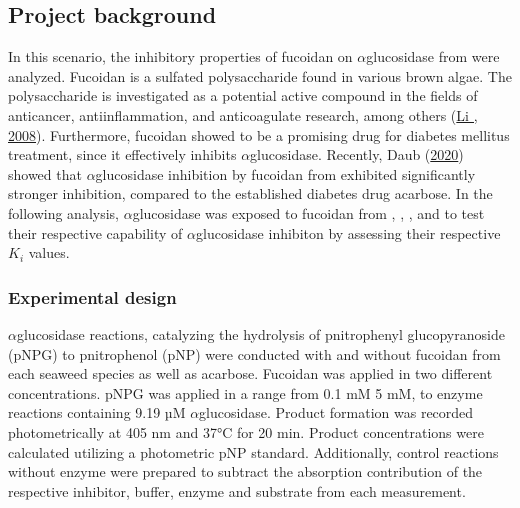 \documentclass[letterpaper,12pt,english]{jupyterBook}
\begin{document}
\subsection{Project background}
\label{\detokenize{scenarios/glycosidase_inhibition:project-background}}
\sphinxAtStartPar
In this scenario, the inhibitory properties of fucoidan on \(\alpha\)\sphinxhyphen{}glucosidase from  were analyzed. Fucoidan is a sulfated polysaccharide found in various brown algae. The polysaccharide is investigated as a potential active compound in the fields of anti\sphinxhyphen{}cancer, anti\sphinxhyphen{}inflammation, and anti\sphinxhyphen{}coagulate research, among others (\hyperlink{cite.references:id7}{Li , 2008}). Furthermore, fucoidan showed to be a promising drug for diabetes mellitus treatment, since it effectively inhibits \(\alpha\)\sphinxhyphen{}glucosidase. Recently, Daub  (\hyperlink{cite.references:id6}{2020}) showed that \(\alpha\)\sphinxhyphen{}glucosidase inhibition by fucoidan from  exhibited significantly stronger inhibition, compared to the established diabetes drug acarbose. In the following analysis, \(\alpha\)\sphinxhyphen{}glucosidase was exposed to fucoidan from , , , and  to test their respective capability of \(\alpha\)\sphinxhyphen{}glucosidase inhibiton by assessing their respective \(K_{i}\) values.


\subsubsection{Experimental design}
\label{\detokenize{scenarios/glycosidase_inhibition:experimental-design}}
\sphinxAtStartPar
\(\alpha\)\sphinxhyphen{}glucosidase reactions, catalyzing the hydrolysis of p\sphinxhyphen{}nitrophenyl glucopyranoside (p\sphinxhyphen{}NPG) to p\sphinxhyphen{}nitrophenol (p\sphinxhyphen{}NP) were conducted with and without fucoidan from each seaweed species as well as acarbose. Fucoidan was applied in two different concentrations. p\sphinxhyphen{}NPG was applied in a range from 0.1 mM \sphinxhyphen{} 5 mM, to enzyme reactions containing 9.19 µM \(\alpha\)\sphinxhyphen{}glucosidase.
Product formation was recorded photometrically at 405 nm and 37°C for 20 min. Product concentrations were calculated utilizing a photometric p\sphinxhyphen{}NP standard. Additionally, control reactions without enzyme were prepared to subtract the absorption contribution of the respective inhibitor, buffer, enzyme and substrate from each measurement.
\end{document}
